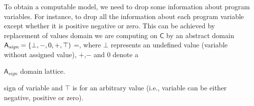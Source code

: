 To obtain a computable model, we need to drop some information about program
variables. For instance, to drop all the information about each program
variable except whether it is positive negative or zero. This can be achieved
by replacement of values domain we are computing on $\mathsf{C}$ by an abstract
domain $\mathsf{A}_{\textit{sign}} = \{ \bot, -, 0, +, \top)$ =, where $\bot$ represents an
undefined value (variable without assigned value), $+$,$-$ and $0$ denote a
\begin{marginfigure}%
    \centering
    \caption{$\mathsf{A}_{\textit{sign}}$ domain lattice.}
    \label{fig:signd}%
\end{marginfigure}%
sign of variable and $\top$ is for an arbitrary value (i.e., variable can be
either negative, positive or zero).

